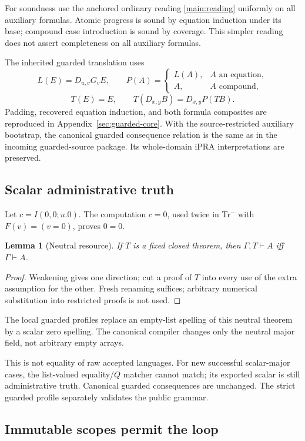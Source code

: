 \documentclass[11pt]{article}
\newtheorem{lemma}[theorem]{Lemma}
\theoremstyle{definition}\newtheorem{definition}[theorem]{Definition}
\theoremstyle{remark}\newtheorem{remark}[theorem]{Remark}
\begin{document}
For soundness use the anchored ordinary reading
\eqref{main:reading} uniformly on all auxiliary formulas.
Atomic progress is sound by equation induction under its base;
compound case introduction is sound by coverage. This simpler
reading does not assert completeness on all auxiliary formulas.

The inherited guarded translation uses
\[
 L(E)=D_{u,v}G_vE,\qquad
 P(A)=\begin{cases}L(A),&A\text{ an equation},\\A,&A\text{ compound},\end{cases}
\]
\[
                    T(E)=E,\qquad
                    T(D_{x,y}B)=D_{x,y}P(TB).
\]
Padding, recovered equation induction, and both formula composites
are reproduced in Appendix~\ref{sec:guarded-core}. With the
source-restricted auxiliary bootstrap, the canonical guarded
consequence relation is the same as in the incoming guarded-source
package. Its whole-domain iPRA interpretations are preserved.

\subsection{Scalar administrative truth}

Let $c=I(0,0;u.0)$. The computation $c=0$, used twice in Tr$^{-}$
with $F(v)=(v=0)$, proves $0=0$.

\begin{lemma}[Neutral resource]
If $T$ is a fixed closed theorem, then
$\Gamma,T\vdash A$ iff $\Gamma\vdash A$.
\end{lemma}
\begin{proof}
Weakening gives one direction; cut a proof of $T$ into every use
of the extra assumption for the other. Fresh renaming suffices;
arbitrary numerical substitution into restricted proofs is not used.
\end{proof}

The local guarded profiles replace an empty-list spelling of this
neutral theorem by a scalar zero spelling. The canonical compiler
changes only the neutral major field, not arbitrary empty arrays.

This is not equality of raw accepted languages. For new successful
scalar-major cases, the list-valued equality/$Q$ matcher cannot
match; its exported scalar is still administrative truth.
Canonical guarded consequences are unchanged. The strict guarded
profile separately validates the public grammar.

\subsection{Immutable scopes permit the loop}
\end{document}
